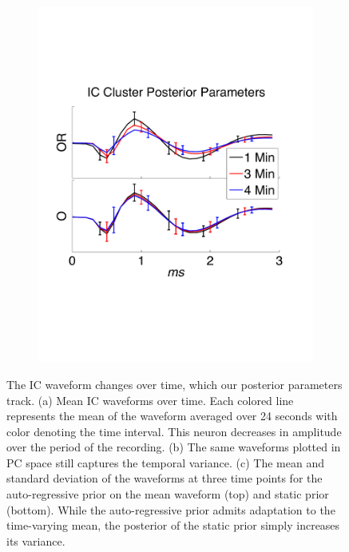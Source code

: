 \begin{center}
\begin{figure}
\begin{subfigure}[b]{.33\textwidth}
\includegraphics[width=\textwidth]{../figs/new/ARvsStationary.pdf}
\caption{}
\label{fig:AR}
\end{subfigure}
\vspace{-.3in}
\caption{
The IC waveform changes over time, which our posterior parameters track. 
(a) Mean IC waveforms over time.  Each colored line represents the mean of the waveform averaged over 24 seconds with color denoting the time interval.  This neuron decreases in amplitude over the period of the recording. 
(b) The same waveforms plotted in PC space still captures the temporal variance.
(c) The mean and standard deviation of the waveforms at three time points for the auto-regressive prior on the mean waveform (top) and static prior (bottom). While the auto-regressive prior admits adaptation to the time-varying mean, the posterior of the static prior simply increases its variance.  
}
\end{figure}
\end{center}

\vspace{-10pt}
